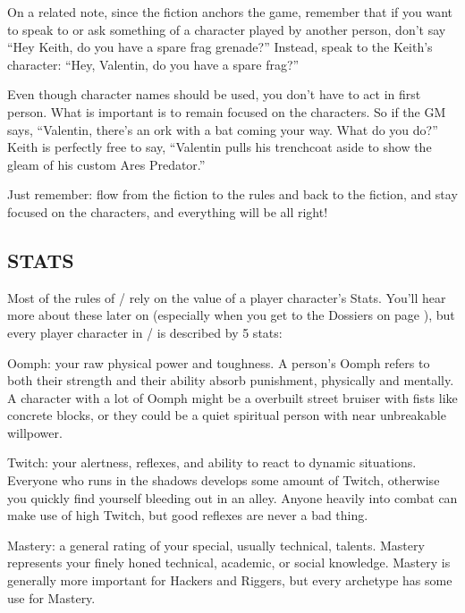 \documentclass[oneside,10pt]{article}
\begin{document}
\begin{multicols}{2}
On a related note, since the fiction anchors the game, remember that
if you want to speak to or ask something of a character played by
another person, don’t say ``Hey Keith, do you have a spare frag
grenade?'' Instead, speak to the Keith's character: ``Hey, Valentin, do
you have a spare frag?''

Even though character names should be used, you don’t have to act in
first person. What is important is to remain focused on the
characters. So if the GM says, ``Valentin, there’s an ork with a bat
coming your way. What do you do?'' Keith is perfectly free to say,
``Valentin pulls his trenchcoat aside to show the gleam of his custom
Ares Predator.''

Just remember: flow from the fiction to the rules and back to the
fiction, and stay focused on the characters, and everything will be
all right!


\subsection{STATS}
\label{stats}

Most of the rules of \SW/ rely on the value of a player character’s
Stats. You’ll hear more about these later on (especially when you get
to the Dossiers on page \pageref{dossiers}), but every player
character in \SW/ is described by 5 stats:

\vspace{.1cm}

\begin{dent}
{\shadowrunbfont Oomph:} your raw physical power and toughness. A
person's Oomph refers to both their strength and their ability absorb
punishment, physically and mentally. A character with a lot of Oomph
might be a overbuilt street bruiser with fists like concrete blocks,
or they could be a quiet spiritual person with near unbreakable willpower.

{\shadowrunbfont Twitch:} your alertness, reflexes, and ability to react to
dynamic situations. Everyone who runs in the shadows develops some
amount of Twitch, otherwise you quickly find yourself bleeding out in
an alley. Anyone heavily into combat can make use of high Twitch, but
good reflexes are never a bad thing.

{\shadowrunbfont Mastery:} a general rating of your special, usually
technical, talents. Mastery represents your finely honed technical,
academic, or social knowledge. Mastery is generally more important for
Hackers and Riggers, but every archetype has some use for Mastery.


\end{dent}
\end{multicols}
\end{document}
